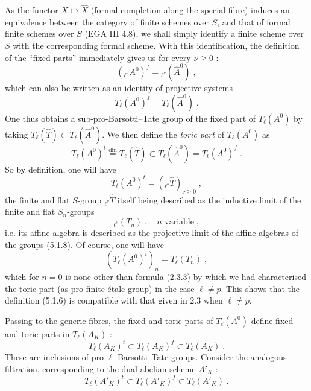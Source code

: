 \documentclass[11pt]{article}
\newcommand{\Tl}{T_{\ell}}
\begin{document}
As the functor $X \mapsto \hat{X}$ (formal completion along the special
fibre) induces an equivalence between the category of finite schemes
over $S$, and that of formal finite schemes over $S$ (EGA III 4.8), we
shall simply identify a finite scheme over $S$ with the corresponding
formal scheme. With this identification, the definition of the ``fixed
parts'' immediately gives us for every $\nu \geq 0$ :
\begin{equation}
({}_{\ell^{\nu}}\!A^0)^f = {}_{\ell^{\nu}}(\hat{A}^0) \; ,
\end{equation}
which can also be written as an identity of projective systems
\begin{equation}
\Tl(A^0)^f = \Tl(\hat{A}^0) \; .
\end{equation}
One thus obtains a sub-pro-Barsotti--Tate group of the fixed part of
$\Tl(A^0)$ by taking $\Tl(\hat{T}) \subset \Tl(\hat{A}^0)$. We then
define the \emph{toric part} of $\Tl(A^0)$ as
\begin{equation}
\Tl(A^0)^t \overset{\mathrm{dfn}}{=} \Tl(\hat{T}) \subset
\Tl(\hat{A}^0) = \Tl(A^0)^f \; .
\end{equation}
So by definition, one will have
\begin{equation}
\Tl(A^0)^t = ({}_{\ell^{\nu}}\!\hat{T})_{\nu \geq 0} \; ,
\end{equation}
the finite and flat $S$-group ${}_{\ell^{\nu}}\!\hat{T}$ itself being
described as the inductive limit of the finite and flat $S_n$-groups
\begin{equation}
{}_{\ell^{\nu}}(T_n) \; , \quad n \text{ variable} \; ,
\end{equation}
i.e. its affine algebra is described as the projective limit of the
affine algebras of the groups (5.1.8). Of course, one will have
\begin{equation}
(\Tl(A^0)^t)_n = \Tl(T_n) \; ,
\end{equation}
which for $n = 0$ is none other than formula (2.3.3) by which we had
characterised the toric part (as pro-finite-\'etale group) in the case
$\ell \neq p$. This shows that the definition (5.1.6) is compatible
with that given in 2.3 when $\ell \neq p$.

\smallskip

Passing to the generic fibres, the fixed and toric parts of
$\Tl(A^0)$ define fixed and toric parts in $\Tl(A_K)$ :
\begin{equation}
\Tl(A_K)^t \subset \Tl(A_K)^f \subset \Tl(A_K) \; .
\end{equation}
These are inclusions of pro-$\ell$-Barsotti--Tate groups. Consider the
analogous filtration, corresponding to the dual abelian scheme
$A'_K$ :
\begin{equation}
\Tl(A'_K)^t \subset \Tl(A'_K)^f \subset \Tl(A'_K) \; .
\end{equation}
\end{document}
